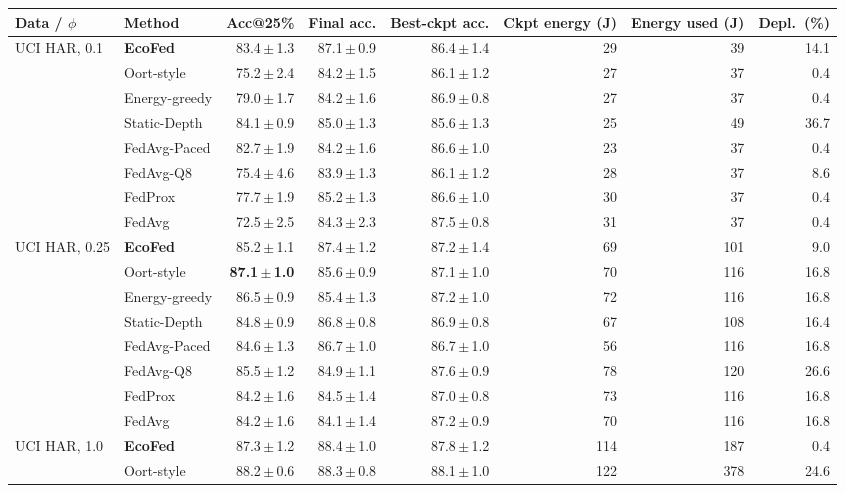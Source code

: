 \begin{tabular}{@{}llrrrrrr@{}}
\toprule
Data / $\phi$ & Method & Acc@25\% & Final acc. & Best-ckpt acc. & Ckpt energy (J) & Energy used (J) & Depl.\ (\%)\\
\midrule
UCI HAR, 0.1 & \textbf{EcoFed} & 83.4\,$\pm$\,1.3 & 87.1\,$\pm$\,0.9 & 86.4\,$\pm$\,1.4 & 29 & 39 & 14.1\\
 & Oort-style & 75.2\,$\pm$\,2.4 & 84.2\,$\pm$\,1.5 & 86.1\,$\pm$\,1.2 & 27 & 37 & 0.4\\
 & Energy-greedy & 79.0\,$\pm$\,1.7 & 84.2\,$\pm$\,1.6 & 86.9\,$\pm$\,0.8 & 27 & 37 & 0.4\\
 & Static-Depth & 84.1\,$\pm$\,0.9 & 85.0\,$\pm$\,1.3 & 85.6\,$\pm$\,1.3 & 25 & 49 & 36.7\\
 & FedAvg-Paced & 82.7\,$\pm$\,1.9 & 84.2\,$\pm$\,1.6 & 86.6\,$\pm$\,1.0 & 23 & 37 & 0.4\\
 & FedAvg-Q8 & 75.4\,$\pm$\,4.6 & 83.9\,$\pm$\,1.3 & 86.1\,$\pm$\,1.2 & 28 & 37 & 8.6\\
 & FedProx & 77.7\,$\pm$\,1.9 & 85.2\,$\pm$\,1.3 & 86.6\,$\pm$\,1.0 & 30 & 37 & 0.4\\
 & FedAvg & 72.5\,$\pm$\,2.5 & 84.3\,$\pm$\,2.3 & 87.5\,$\pm$\,0.8 & 31 & 37 & 0.4\\
\midrule
UCI HAR, 0.25 & \textbf{EcoFed} & 85.2\,$\pm$\,1.1 & 87.4\,$\pm$\,1.2 & 87.2\,$\pm$\,1.4 & 69 & 101 & 9.0\\
 & Oort-style & \textbf{87.1\,$\pm$\,1.0} & 85.6\,$\pm$\,0.9 & 87.1\,$\pm$\,1.0 & 70 & 116 & 16.8\\
 & Energy-greedy & 86.5\,$\pm$\,0.9 & 85.4\,$\pm$\,1.3 & 87.2\,$\pm$\,1.0 & 72 & 116 & 16.8\\
 & Static-Depth & 84.8\,$\pm$\,0.9 & 86.8\,$\pm$\,0.8 & 86.9\,$\pm$\,0.8 & 67 & 108 & 16.4\\
 & FedAvg-Paced & 84.6\,$\pm$\,1.3 & 86.7\,$\pm$\,1.0 & 86.7\,$\pm$\,1.0 & 56 & 116 & 16.8\\
 & FedAvg-Q8 & 85.5\,$\pm$\,1.2 & 84.9\,$\pm$\,1.1 & 87.6\,$\pm$\,0.9 & 78 & 120 & 26.6\\
 & FedProx & 84.2\,$\pm$\,1.6 & 84.5\,$\pm$\,1.4 & 87.0\,$\pm$\,0.8 & 73 & 116 & 16.8\\
 & FedAvg & 84.2\,$\pm$\,1.6 & 84.1\,$\pm$\,1.4 & 87.2\,$\pm$\,0.9 & 70 & 116 & 16.8\\
\midrule
UCI HAR, 1.0 & \textbf{EcoFed} & 87.3\,$\pm$\,1.2 & 88.4\,$\pm$\,1.0 & 87.8\,$\pm$\,1.2 & 114 & 187 & 0.4\\
 & Oort-style & 88.2\,$\pm$\,0.6 & 88.3\,$\pm$\,0.8 & 88.1\,$\pm$\,1.0 & 122 & 378 & 24.6\\

\end{tabular}

